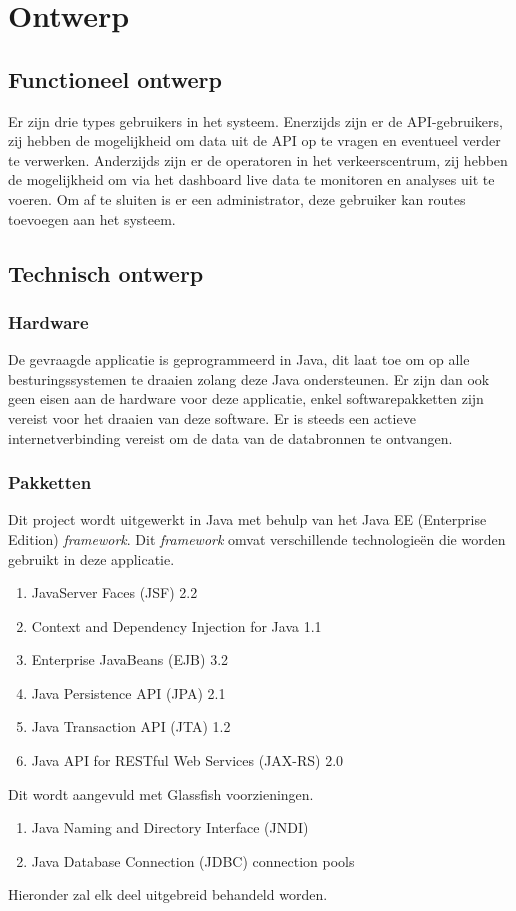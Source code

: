 \documentclass[ps,a4paper,oneside]{report}
\begin{document}
\chapter{Ontwerp}
\section{Functioneel ontwerp}
Er zijn drie types gebruikers in het systeem. Enerzijds zijn er de API-gebruikers, zij hebben de mogelijkheid om data uit de API op te vragen en eventueel verder te verwerken. Anderzijds zijn er de operatoren in het verkeerscentrum, zij hebben de mogelijkheid om via het dashboard live data te monitoren en analyses uit te voeren. Om af te sluiten is er een administrator, deze gebruiker kan routes toevoegen aan het systeem.
\section{Technisch ontwerp}
\subsection{Hardware}
De gevraagde applicatie is geprogrammeerd in Java, dit laat toe om op alle besturingssystemen te draaien zolang deze Java ondersteunen. Er zijn dan ook geen eisen aan de hardware voor deze applicatie, enkel softwarepakketten zijn vereist voor het draaien van deze software. Er is steeds een actieve \\internetverbinding vereist om de data van de databronnen te ontvangen.
\subsection{Pakketten}
Dit project wordt uitgewerkt in Java met behulp van het Java EE (Enterprise Edition) \textit{framework}. Dit \textit{framework} omvat verschillende technologie\"en die worden gebruikt in deze applicatie.
\begin{enumerate}	
	\item JavaServer Faces (JSF) 2.2
	\item Context and Dependency Injection for Java 1.1
	\item Enterprise JavaBeans (EJB) 3.2
	\item Java Persistence API (JPA) 2.1
	\item Java Transaction API (JTA) 1.2
	\item Java API for RESTful Web Services (JAX-RS) 2.0
\end{enumerate}
Dit wordt aangevuld met Glassfish voorzieningen.
\begin{enumerate}
	\item Java Naming and Directory Interface (JNDI)
	\item Java Database Connection (JDBC) connection pools
\end{enumerate}
Hieronder zal elk deel uitgebreid behandeld worden.
\end{document}
